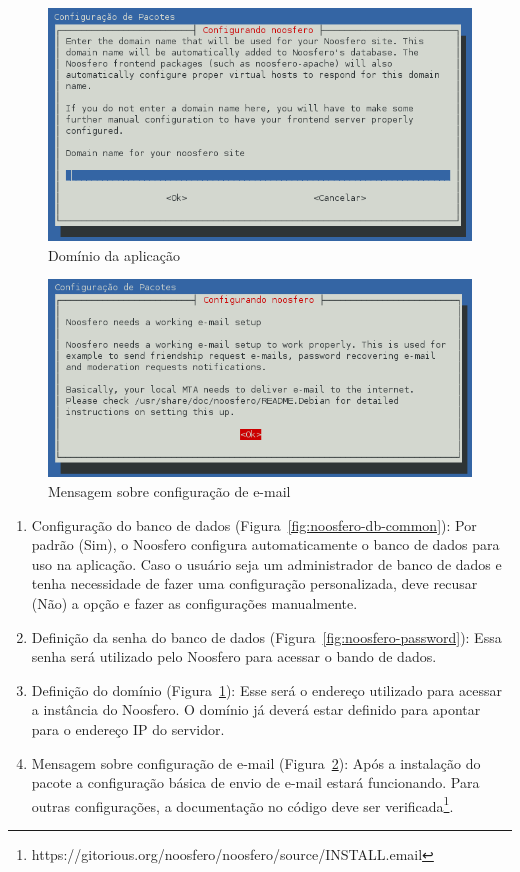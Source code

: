 \documentclass[[a4paper,11pt]{article}
\begin{document}
\begin{figure}[h]
\center
\includegraphics[scale=0.4]{domain-3.png}
\caption{Domínio da aplicação}
\label{fig:noosfero-domain}
\end{figure}

\begin{figure}[h]
\center
\includegraphics[scale=0.4]{email-setup-4.png}
\caption{Mensagem sobre configuração de e-mail}
\label{fig:noosfero-email-setup}
\end{figure}

\begin{enumerate}
  \item Configuração do banco de dados
(Figura~\ref{fig:noosfero-db-common}): Por padrão (Sim), o Noosfero configura
automaticamente o banco de dados para uso na aplicação. Caso o usuário
seja um administrador de banco de dados e tenha necessidade de fazer uma
configuração personalizada, deve recusar (Não) a opção e fazer as
configurações manualmente.
  \item Definição da senha do banco de dados
(Figura~\ref{fig:noosfero-password}): Essa senha será utilizado pelo
Noosfero para acessar o bando de dados.
  \item Definição do domínio
(Figura~\ref{fig:noosfero-domain}): Esse será o endereço utilizado para
acessar a instância do Noosfero. O domínio já deverá estar definido para
apontar para o endereço IP do servidor.
  \item Mensagem sobre configuração de e-mail
(Figura~\ref{fig:noosfero-email-setup}): Após a instalação do pacote a
configuração básica de envio de e-mail estará funcionando. Para outras
configurações, a documentação no código deve ser
verificada\footnote{https://gitorious.org/noosfero/noosfero/source/INSTALL.email}.
\end{enumerate}
\end{document}
